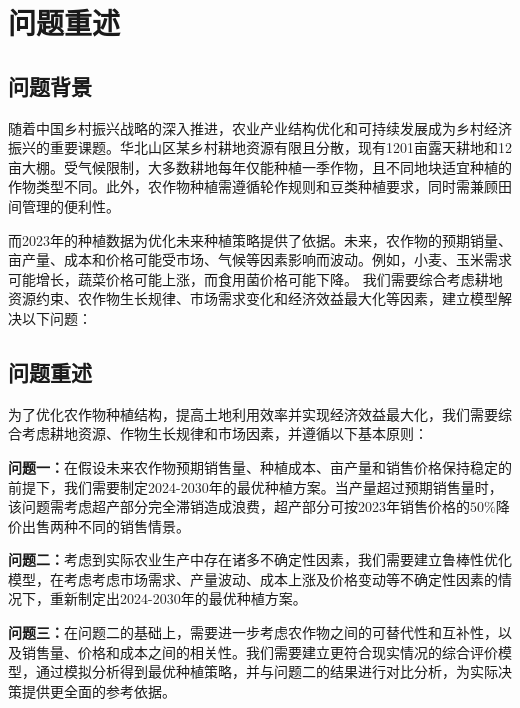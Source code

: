 \chapter[\hspace{0pt}问题重述]{{\heiti{}\hspace{0pt}问题重述}}\label{chapter1: 问题重述}
\removelofgap
\removelotgap
\setcounter{page}{2}  %

\section[\hspace{-2pt}问题背景]{{\heiti{} \hspace{-8pt}问题背景}}\label{section1: 问题背景}

随着中国乡村振兴战略的深入推进，农业产业结构优化和可持续发展成为乡村经济振兴的重要课题。华北山区某乡村耕地资源有限且分散，现有1201亩露天耕地和12亩大棚。受气候限制，大多数耕地每年仅能种植一季作物，且不同地块适宜种植的作物类型不同。此外，农作物种植需遵循轮作规则和豆类种植要求，同时需兼顾田间管理的便利性。

而2023年的种植数据为优化未来种植策略提供了依据。未来，农作物的预期销量、亩产量、成本和价格可能受市场、气候等因素影响而波动。例如，小麦、玉米需求可能增长，蔬菜价格可能上涨，而食用菌价格可能下降。 我们需要综合考虑耕地资源约束、农作物生长规律、市场需求变化和经济效益最大化等因素，建立模型解决以下问题：

\section[\hspace{-2pt}问题重述]{{\heiti{} \hspace{-8pt}问题重述}}\label{section1: 问题重述}

为了优化农作物种植结构，提高土地利用效率并实现经济效益最大化，我们需要综合考虑耕地资源、作物生长规律和市场因素，并遵循以下基本原则：

\textbf{问题一：}在假设未来农作物预期销售量、种植成本、亩产量和销售价格保持稳定的前提下，我们需要制定2024-2030年的最优种植方案。当产量超过预期销售量时，该问题需考虑超产部分完全滞销造成浪费，超产部分可按2023年销售价格的$50\%$降价出售两种不同的销售情景。

\textbf{问题二：}考虑到实际农业生产中存在诸多不确定性因素，我们需要建立鲁棒性优化模型，在考虑考虑市场需求、产量波动、成本上涨及价格变动等不确定性因素的情况下，重新制定出2024-2030年的最优种植方案。

\textbf{问题三：}在问题二的基础上，需要进一步考虑农作物之间的可替代性和互补性，以及销售量、价格和成本之间的相关性。我们需要建立更符合现实情况的综合评价模型，通过模拟分析得到最优种植策略，并与问题二的结果进行对比分析，为实际决策提供更全面的参考依据。
